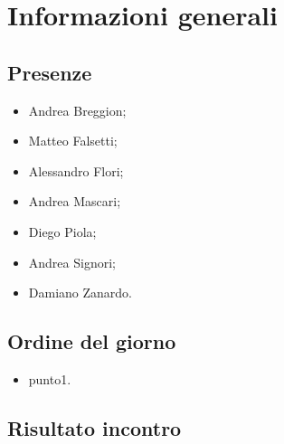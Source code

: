 \section{Informazioni generali}
    \def\modifiche { 
        {Data, YYYY-MM-DD},
        {Ora inizio, hh:mm},
        {Ora fine, hh:mm},
        {Luogo, piattaforma},
    }
    

\subsection{Presenze}
\begin{itemize}
    \item Andrea Breggion;
    \item Matteo Falsetti;
    \item Alessandro Flori;
    \item Andrea Mascari;
    \item Diego Piola;
    \item Andrea Signori;
    \item Damiano Zanardo.
\end{itemize}
\subsection{Ordine del giorno}
\begin{itemize}
    \item punto1.
\end{itemize}

\subsection{Risultato incontro}
